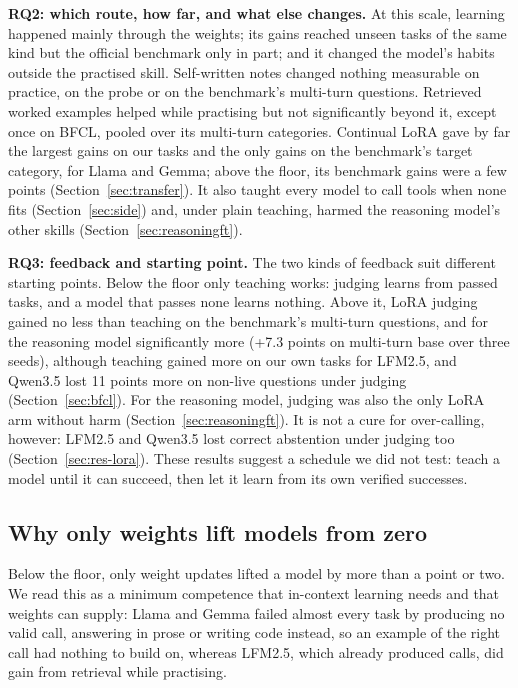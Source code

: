 \documentclass[a4paper,fleqn]{cas-dc}
\begin{document}
\textbf{RQ2: which route, how far, and what else changes.} At this scale, learning happened mainly through the weights;
its gains reached unseen tasks of the same kind but the official benchmark only in part; and it changed the model's
habits outside the practised skill. Self-written notes changed nothing measurable on practice, on the probe or on the
benchmark's multi-turn questions. Retrieved worked examples helped while practising but not significantly beyond it,
except once on BFCL, pooled over its multi-turn categories. Continual LoRA gave by far the largest gains on our tasks
and the only gains on the benchmark's target category, for Llama and Gemma; above the floor, its benchmark gains were a
few points (Section~\ref{sec:transfer}). It also taught every model to call tools when none fits
(Section~\ref{sec:side}) and, under plain teaching, harmed the reasoning model's other skills
(Section~\ref{sec:reasoningft}).

\textbf{RQ3: feedback and starting point.} The two kinds of feedback suit different starting points. Below the floor
only teaching works: judging learns from passed tasks, and a model that passes none learns nothing. Above it, LoRA
judging gained no less than teaching on the benchmark's multi-turn questions, and for the reasoning model significantly
more (+7.3 points on multi-turn base over three seeds), although teaching gained more on our own tasks for LFM2.5, and
Qwen3.5 lost 11 points more on non-live questions under judging (Section~\ref{sec:bfcl}). For the reasoning
model, judging was also the only LoRA arm without harm (Section~\ref{sec:reasoningft}). It is not a cure for
over-calling, however: LFM2.5 and Qwen3.5 lost correct abstention under judging too (Section~\ref{sec:res-lora}).
These results suggest a schedule we did not test: teach a model until it can succeed, then let it learn from its own
verified successes.

\subsection{Why only weights lift models from zero}\label{sec:floor}
Below the floor, only weight updates lifted a model by more than a point or two. We read this as a
minimum competence that in-context learning needs and that weights can supply: Llama and Gemma failed almost every task
by producing no valid call, answering in prose or writing code instead, so an example of the right call had nothing to
build on, whereas LFM2.5, which already produced calls, did gain from retrieval while practising.
\end{document}
